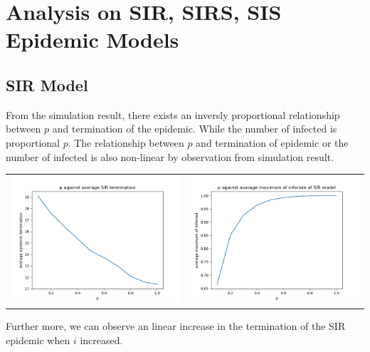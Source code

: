 \documentclass{subfile}
\begin{document}
  \section{Analysis on SIR, SIRS, SIS Epidemic Models}
  \subsection{SIR Model}
  From the simulation result, there exists an inversly proportional relationship between \(p\) and termination of the epidemic. While the number of infected is proportional \(p\). The relationship between \(p\) and termination of epidemic or the number of infected is also non-linear by observation from simulation result.
  \begin{tabular}{cc}
    \includegraphics[scale=0.5]{p_sir_t} & \includegraphics[scale=0.5]{p_infect_sir}\\
  \end{tabular}

  Further more, we can observe an linear increase in the termination of the SIR epidemic when \(i\) increased.
\end{document}
